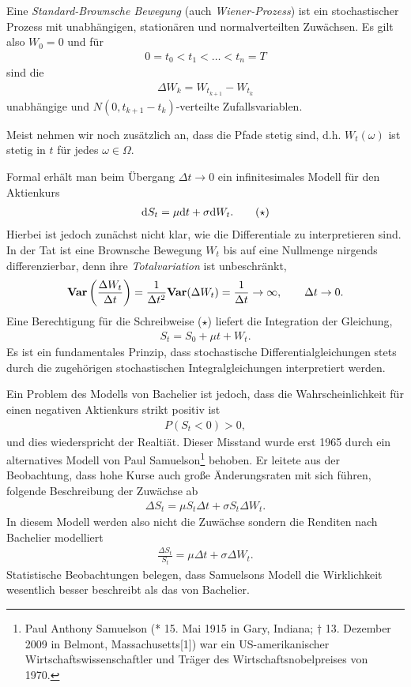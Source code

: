 \begin{defn}
Eine \emph{Standard-Brownsche Bewegung} (auch \emph{Wiener-Prozess}) ist ein
stochastischer Prozess mit unabhängigen, stationären und
normalverteilten Zuwächsen. Es gilt also $W_{0} = 0$ und für
\begin{align*}
0 = t_0 < t_1 < \ldots < t_n = T
\end{align*}
sind die
\begin{align*}
\Delta W_k = W_{t_{k+1}}-W_{t_{k}}
\end{align*}
unabhängige und $N(0,t_{k+1}-t_k)$-verteilte Zufallsvariablen.\fish
\end{defn}

Meist nehmen wir noch zusätzlich an, dass die Pfade stetig sind,
d.h. $W_t(\omega)$ ist stetig in $t$ für jedes $\omega\in\Omega$.

Formal erhält man beim Übergang $\Delta t \to 0$ ein infinitesimales
Modell für den Aktienkurs
\begin{align*}
\diffd S_t = \mu \dt + \sigma \diffd W_t.\tag{\ensuremath{\star}}
\end{align*}
Hierbei ist jedoch zunächst nicht klar, wie die Differentiale zu interpretieren
sind. In der Tat ist eine Brownsche Bewegung $W_t$ bis auf eine Nullmenge
nirgends differenzierbar, denn ihre \emph{Totalvariation} ist unbeschränkt,
\begin{align*}
\mathbf{Var}\left(\frac{\Delta W_t}{\Delta t} \right) = 
\frac{1}{\Delta t^2}\mathbf{Var}(\Delta W_t) = \frac{1}{\Delta t}\to \infty,\qquad
\Delta t \to 0.
\end{align*}
Eine Berechtigung für die Schreibweise ($\star$) liefert die Integration der
Gleichung,
\begin{align*}
S_t = S_0 + \mu t + W_t.
\end{align*}
Es ist ein fundamentales Prinzip, dass stochastische Differentialgleichungen
stets durch die zugehörigen stochastischen Integralgleichungen interpretiert
werden.

Ein Problem des Modells von Bachelier ist jedoch, dass die Wahrscheinlichkeit
für einen negativen Aktienkurs strikt positiv ist
\begin{align*}
P(S_t < 0)  > 0,
\end{align*}
und dies wiederspricht der Realtiät. Dieser Misstand wurde erst 1965 durch ein
alternatives Modell von Paul Samuelson\footnote{Paul Anthony Samuelson (* 15.
Mai 1915 in Gary, Indiana; † 13. Dezember 2009 in Belmont, Massachusetts[1])
war ein US-amerikanischer Wirtschaftswissenschaftler und Träger des
Wirtschaftsnobelpreises von 1970.} behoben. Er leitete aus der Beobachtung, dass
hohe Kurse auch große Änderungsraten mit sich führen, folgende Beschreibung der
Zuwächse ab
\begin{align*}
\Delta S_t = \mu S_t \Delta t + \sigma S_t \Delta W_t.
\end{align*}
In diesem Modell werden also nicht die Zuwächse sondern die Renditen nach
Bachelier modelliert
\begin{align*}
\frac{\Delta S_t}{S_t} = \mu \Delta t  + \sigma \Delta W_t.
\end{align*} 
Statistische Beobachtungen belegen, dass Samuelsons Modell die Wirklichkeit
wesentlich besser beschreibt als das von Bachelier.

